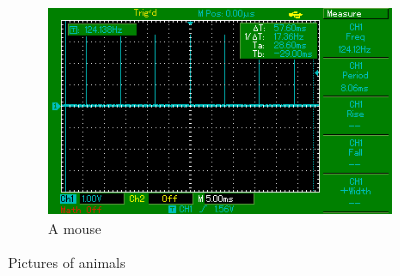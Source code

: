 \begin{figure}[HT!]
	\begin{subfigure}{8cm}
		\centering
		\includegraphics[keepaspectratio,width=\textwidth]{fig/osc-slow-down.png}
		\caption{A mouse}
		\label{fig:mouse}
	\end{subfigure}
	\caption{Pictures of animals}\label{fig:animals}
\end{figure}

